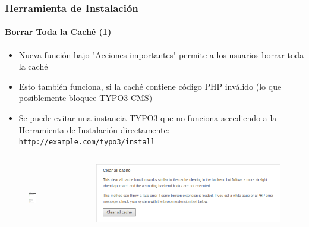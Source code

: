 
\begin{frame}[fragile]
	\frametitle{Herramienta de Instalación}
	\framesubtitle{Borrar Toda la Caché (1)}

	\begin{itemize}
		\item Nueva función bajo "Acciones importantes" permite a los usuarios borrar toda la caché
		\item Esto también funciona, si la caché contiene código PHP inválido\newline
			(lo que posiblemente bloquee TYPO3 CMS)
		\item Se puede evitar una instancia TYPO3 que no funciona accediendo a la Herramienta de Instalación directamente: \texttt{http://example.com/typo3/install}
	\end{itemize}

	\begin{columns}[T]
		\begin{column}{.3\textwidth}
			\begin{figure}\vspace*{-0.4cm}
				\includegraphics[width=0.7\linewidth,height=3cm]{Images/InstallTool/ImportantActions.png}
			\end{figure}
		\end{column}
		\begin{column}{.7\textwidth}
			\begin{figure}\vspace*{-0.4cm}
				\includegraphics[width=0.9\linewidth]{Images/InstallTool/ClearAllCache.png}
			\end{figure}
		\end{column}
	\end{columns}

\end{frame}


